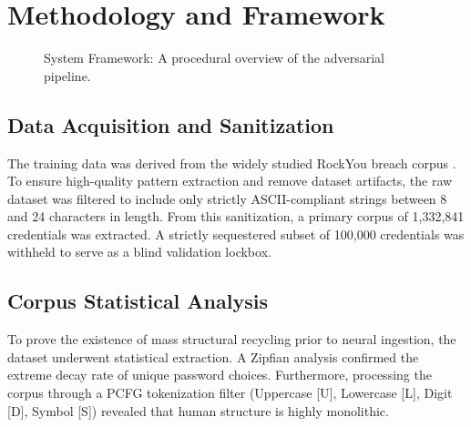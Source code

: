 \documentclass[conference]{IEEEtran}
\begin{document}
\section{Methodology and Framework}

\begin{figure}[htbp]
\centering
{}
\caption{System Framework: A procedural overview of the adversarial pipeline.}
\label{fig:framework}
\end{figure}

\subsection{Data Acquisition and Sanitization}
The training data was derived from the widely studied RockYou breach corpus \cite{rockyou}. To ensure high-quality pattern extraction and remove dataset artifacts, the raw dataset was filtered to include only strictly ASCII-compliant strings between 8 and 24 characters in length. From this sanitization, a primary corpus of 1,332,841 credentials was extracted. A strictly sequestered subset of 100,000 credentials was withheld to serve as a blind validation lockbox.

\subsection{Corpus Statistical Analysis}
To prove the existence of mass structural recycling prior to neural ingestion, the dataset underwent statistical extraction. A Zipfian analysis confirmed the extreme decay rate of unique password choices. Furthermore, processing the corpus through a PCFG tokenization filter (Uppercase [U], Lowercase [L], Digit [D], Symbol [S]) revealed that human structure is highly monolithic. 
\end{document}
